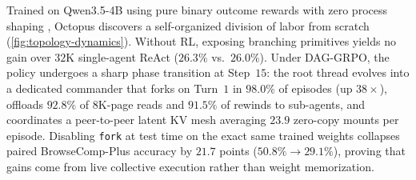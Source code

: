 \documentclass{article}
\begin{document}
Trained on Qwen3.5-4B using pure binary outcome rewards with zero process shaping \citep{deepseek2025r1}, Octopus discovers a self-organized division of labor from scratch (\cref{fig:topology-dynamics}). Without RL, exposing branching primitives yields no gain over $32\text{K}$ single-agent ReAct ($26.3\%$ vs.\ $26.0\%$). Under DAG-GRPO, the policy undergoes a sharp phase transition at Step~$15$: the root thread evolves into a dedicated commander that forks on Turn~$1$ in $98.0\%$ of episodes (up $38\times$), offloads $92.8\%$ of $8\text{K}$-page reads and $91.5\%$ of rewinds to sub-agents, and coordinates a peer-to-peer latent KV mesh averaging $23.9$ zero-copy mounts per episode. Disabling \texttt{fork} at test time on the exact same trained weights collapses paired BrowseComp-Plus accuracy by $21.7$ points ($50.8\% \to 29.1\%$), proving that gains come from live collective execution rather than weight memorization.
\end{document}

